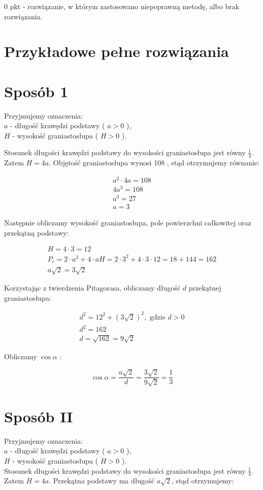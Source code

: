 \documentclass[10pt]{article}
\begin{document}
0 pkt - rozwiązanie, w którym zastosowano niepoprawną metodę, albo brak rozwiązania.

\section*{Przykładowe pełne rozwiązania}
\section*{Sposób 1}
Przyjmujemy oznaczenia:\\
$a$ - długość krawędzi podstawy ( $a>0$ ),\\
$H$ - wysokość graniastosłupa ( $H>0$ ).

Stosunek długości krawędzi podstawy do wysokości graniastosłupa jest równy $\frac{1}{4}$. Zatem $H=4 a$. Objętość graniastosłupa wynosi 108 , stąd otrzymujemy równanie:

$$
\begin{gathered}
a^{2} \cdot 4 a=108 \\
4 a^{3}=108 \\
a^{3}=27 \\
a=3
\end{gathered}
$$

Następnie obliczamy wysokość graniastosłupa, pole powierzchni całkowitej oraz przekątną podstawy:

$$
\begin{gathered}
H=4 \cdot 3=12 \\
P_{c}=2 \cdot a^{2}+4 \cdot a H=2 \cdot 3^{2}+4 \cdot 3 \cdot 12=18+144=162 \\
a \sqrt{2}=3 \sqrt{2}
\end{gathered}
$$

Korzystając z twierdzenia Pitagorasa, obliczamy długość $d$ przekątnej graniastosłupa:

$$
\begin{gathered}
d^{2}=12^{2}+(3 \sqrt{2})^{2}, \text { gdzie } d>0 \\
d^{2}=162 \\
d=\sqrt{162}=9 \sqrt{2}
\end{gathered}
$$

Obliczamy $\cos \alpha$ :

$$
\cos \alpha=\frac{a \sqrt{2}}{d}=\frac{3 \sqrt{2}}{9 \sqrt{2}}=\frac{1}{3}
$$

\section*{Sposób II}
Przyjmujemy oznaczenia:\\
$a$ - długość krawędzi podstawy ( $a>0$ ),\\
$H$ - wysokość graniastosłupa ( $H>0$ ).\\
Stosunek długości krawędzi podstawy do wysokości graniastosłupa jest równy $\frac{1}{4}$. Zatem $H=4 a$. Przekątna podstawy ma długość $a \sqrt{2}$, stąd otrzymujemy:
\end{document}

